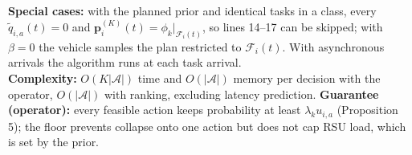 \documentclass[10pt]{article}
\begin{document}
\vspace{3pt}
\footnotesize
\textbf{Special cases:} with the planned prior and identical tasks in a class, every $\tilde q_{i,a}(t)=0$ and $\mathbf p^{(K)}_i(t)=\phi_k|_{\mathcal F_i(t)}$, so lines 14--17 can be skipped; with $\beta=0$ the vehicle samples the plan restricted to $\mathcal F_i(t)$. With asynchronous arrivals the algorithm runs at each task arrival.\\
\textbf{Complexity:} $O(K|\mathcal A|)$ time and $O(|\mathcal A|)$ memory per decision with the operator, $O(|\mathcal A|)$ with ranking, excluding latency prediction.
\textbf{Guarantee (operator):} every feasible action keeps probability at least $\lambda_k u_{i,a}$ (Proposition 5); the floor prevents collapse onto one action but does not cap RSU load, which is set by the prior.
\end{document}
